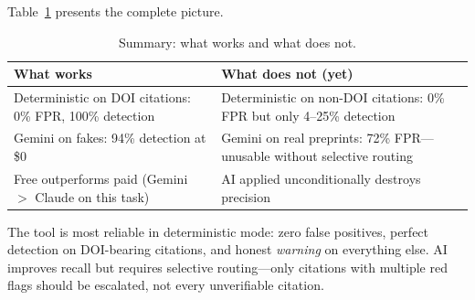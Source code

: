 Table~\ref{tab:summary} presents the complete picture.

\begin{table}[H]
\centering
\caption{Summary: what works and what does not.}
\label{tab:summary}
\begin{tabular}{@{}p{}p{}@{}}
\toprule
\textbf{What works} & \textbf{What does not (yet)} \\
\midrule
Deterministic on DOI citations: 0\% FPR, 100\% detection &
Deterministic on non-DOI citations: 0\% FPR but only 4--25\% detection \\[0.5em]
Gemini on fakes: 94\% detection at \$0 &
Gemini on real preprints: 72\% FPR---unusable without selective routing \\[0.5em]
Free outperforms paid (Gemini $>$ Claude on this task) &
AI applied unconditionally destroys precision \\
\bottomrule
\end{tabular}
\end{table}

\noindent The tool is most reliable in deterministic mode: zero false positives, perfect detection on DOI-bearing citations, and honest \textit{warning} on everything else. AI improves recall but requires selective routing---only citations with multiple red flags should be escalated, not every unverifiable citation.

\enlargethispage{\baselineskip}
